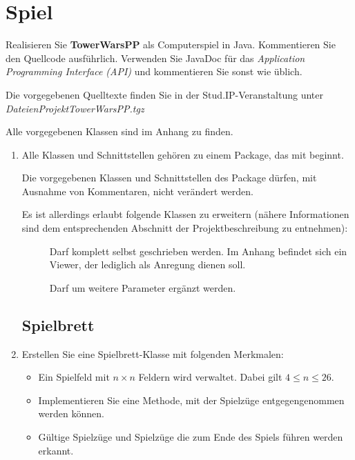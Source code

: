 \section*{Spiel}
Realisieren Sie \textbf{TowerWarsPP} als Computerspiel in Java. Kommentieren Sie den Quellcode ausführlich. Verwenden Sie JavaDoc für das \emph{Application Programming Interface (API)} und kommentieren Sie sonst wie üblich.

Die vorgegebenen Quelltexte finden Sie in der Stud.IP-Veranstaltung unter \\
\textit{Dateien\textrightarrow Projekt\textrightarrow TowerWarsPP.tgz}

Alle vorgegebenen Klassen sind im Anhang zu finden.

\begin{enumerate}
\item Alle Klassen und Schnittstellen gehören zu einem Package, das mit  beginnt.

Die vorgegebenen Klassen und Schnittstellen des Package  dürfen, mit Ausnahme von Kommentaren, nicht verändert werden. 

Es ist allerdings erlaubt folgende Klassen zu erweitern (nähere Informationen sind dem entsprechenden Abschnitt der Projektbeschreibung zu entnehmen):
\begin{description}
\item[] Darf komplett selbst geschrieben werden. Im Anhang befindet sich ein Viewer, der lediglich als Anregung dienen soll.
\item[] Darf um weitere Parameter ergänzt werden.
\end{description}

\newpage
\subsection*{Spielbrett}

\item Erstellen Sie eine Spielbrett-Klasse mit folgenden Merkmalen:
\begin{itemize}
\item Ein Spielfeld mit $n \times n$ Feldern wird verwaltet. Dabei gilt $4 \le n \le 26$.
\item Implementieren Sie eine Methode, mit der Spielzüge entgegengenommen werden können.
\item Gültige Spielzüge und Spielzüge die zum Ende des Spiels führen werden erkannt.


\end{itemize}
\end{enumerate}
